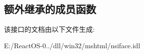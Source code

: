 \subsection*{额外继承的成员函数}


该接口的文档由以下文件生成\+:\begin{DoxyCompactItemize}
\item 
E\+:/\+React\+O\+S-\/0../dll/win32/mshtml/nsiface.\+idl\end{DoxyCompactItemize}
